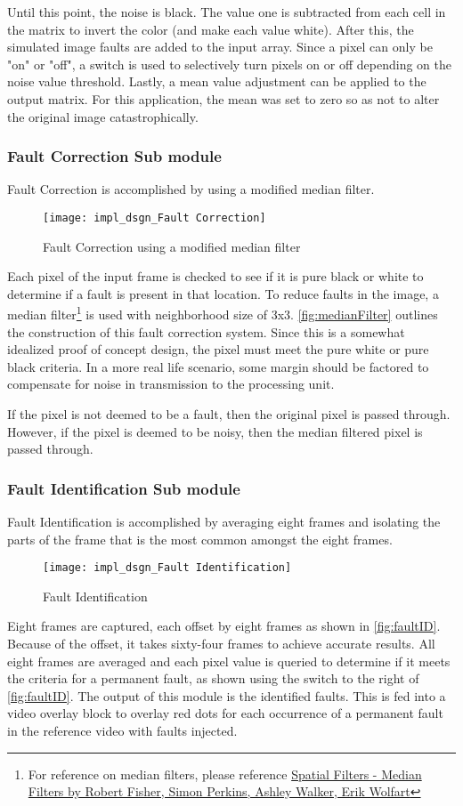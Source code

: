\par Until this point, the noise is black. The value one is subtracted from each cell in the matrix to invert the color (and make each value white). After this, the simulated image faults are added to the input array. Since a pixel can only be "on" or "off", a switch is used to selectively turn pixels on or off depending on the noise value threshold. Lastly, a mean value adjustment can be applied to the output matrix. For this application, the mean was set to zero so as not to alter the original image catastrophically.

\subsubsection{Fault Correction Sub module}
Fault Correction is accomplished by using a modified median filter.
\begin{figure}[H]
    \texttt{[image: impl\_dsgn\_Fault Correction]}
    \caption{Fault Correction using a modified median filter}
    \label{fig:medianFilter}
\end{figure}
 \par Each pixel of the input frame is checked to see if it is pure black or white to determine if a fault is present in that location. To reduce faults in the image, a median filter\footnote{For reference on median filters, please reference \hyperlink{https://homepages.inf.ed.ac.uk/rbf/HIPR2/median.htm}{Spatial Filters - Median Filters by Robert Fisher, Simon Perkins, Ashley Walker, Erik Wolfart}} is used with neighborhood size of 3x3. \autoref{fig:medianFilter} outlines the construction of this fault correction system. Since this is a somewhat idealized proof of concept design, the pixel must meet the pure white or pure black criteria. In a more real life scenario, some margin should be factored to compensate for noise in transmission to the processing unit.
 \par If the pixel is not deemed to be a fault, then the original pixel is passed through. However, if the pixel is deemed to be noisy,  then the median filtered pixel is passed through.
 \subsubsection{Fault Identification Sub module}
 Fault Identification is accomplished by averaging eight frames and isolating the parts of the frame that is the most common amongst the eight frames.
 \begin{figure}[H]
    \texttt{[image: impl\_dsgn\_Fault Identification]}
    \caption{Fault Identification}
    \label{fig:faultID}
\end{figure}
Eight frames are captured, each offset by eight frames as shown in \autoref{fig:faultID}. Because of the offset, it takes sixty-four frames to achieve accurate results. All eight frames are averaged and each pixel value is queried to determine if it meets the criteria for a permanent fault, as shown using the switch to the right of \autoref{fig:faultID}. The output of this module is the identified faults. This is fed into a video overlay block to overlay red dots for each occurrence of a permanent fault in the reference video with faults injected. 


